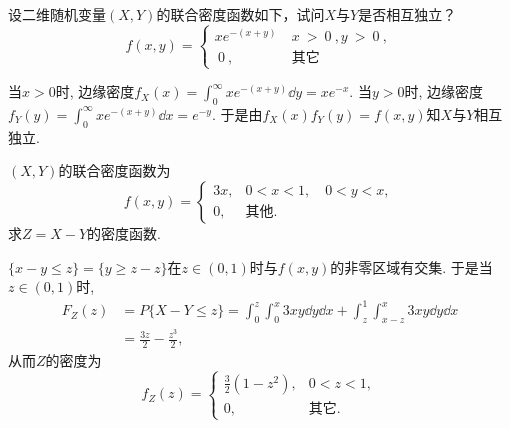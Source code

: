 \documentclass[11pt]{ctexart}
\begin{document}
\begin{example}
设二维随机变量$(X,Y)$的联合密度函数如下，试问$X$与$Y$是否相互独立？
$$
	f(x,y)=
	\begin{cases}
		x e^{-(x+y)}&\:x\:>\:0\:,y\:>\:0\:,\\\:0\:,&\:\text{其它}
	\end{cases}
$$
\end{example}
\begin{solution}
	当$x>0$时, 边缘密度$f_X(x) = \int_0^{\infty} x e^{-(x+y)} \dd y = x e^{-x}$. 
	当$y>0$时, 边缘密度$f_Y(y) = \int_0^{\infty} x e^{-(x+y)} \dd x = e^{-y}$. 
	于是由$f_X(x) f_Y(y) = f(x,y)$知$X$与$Y$相互独立. 
\end{solution}

\begin{example}
$(X,Y)$的联合密度函数为
$$
f(x,y)=\begin{cases}3x,&0<x<1,\quad0<y<x,\\0,&\text{其他}.\end{cases}
$$
求$Z = X - Y$的密度函数. 
\end{example}
\begin{solution}
	$\{x - y \leq z\} = \{y \geq z - z\}$在$z \in (0,1)$时与$f(x,y)$的非零区域有交集. 
	于是当$z \in (0,1)$时, 
	\begin{align*}
		F_Z(z) 
		& = P\{X - Y \leq z\}
		= \int_0^z \int_0^x 3 xy \dd y \dd x + \int_z^1 \int_{x-z}^x 3 xy \dd y \dd x \\
		& = \frac{3z}{2} - \frac{z^3}{2}, 
	\end{align*}
	从而$Z$的密度为
	\begin{equation*}
		f_Z(z) = 
		\begin{cases}
			\frac{3}{2}(1 - z^2), &0 < z < 1, \\
			0, &\text{其它}. 
		\end{cases}
	\end{equation*}
\end{solution}
\end{document}
